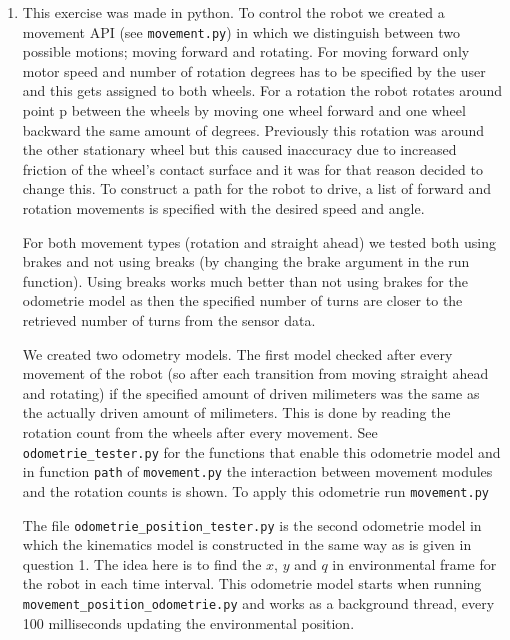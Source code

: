 \documentclass[a4paper, 20pt]{report}
\begin{document}
\begin{enumerate}
    \item
            This exercise was made in python. To control the robot we created 
            a movement API (see \texttt{movement.py})
            in which we distinguish between two possible motions; moving forward
            and rotating. For moving forward only motor speed and number of
            rotation degrees has to be specified by the user and this gets assigned to both
            wheels. For a rotation the robot rotates around point p between the
            wheels by moving
            one wheel forward and one wheel backward the same amount of degrees.
            Previously this rotation was around the other stationary wheel but
            this caused inaccuracy due to increased friction of the wheel's
            contact surface and it was for that reason decided to change this. 
            To construct a path for the robot to drive, a list of forward and rotation
            movements is specified with the desired speed and angle.

            For both movement types (rotation and straight ahead) we tested both using 
            brakes and not using breaks (by changing the brake argument in the run function). 
            Using breaks works much better than not using brakes for the
            odometrie model as then the specified number of turns are closer to
            the retrieved number of turns from the sensor data.

            We created two odometry models. The first model checked after every
            movement of the robot (so after each transition from moving straight
            ahead and rotating) if the specified amount of driven milimeters was the
            same as the actually driven amount of milimeters. This is done by
            reading the rotation count from the wheels after every movement. See
            \texttt{odometrie\_tester.py} for the functions that enable this
            odometrie model and in function \texttt{path} of \texttt{movement.py} the interaction
            between movement modules and the rotation counts is shown. To apply
            this odometrie run \texttt{movement.py}
            
            The file \texttt{odometrie\_position\_tester.py} is the second
            odometrie model in which the kinematics model is constructed in the
            same way as is given in question 1. The idea here is to find the
            $x$, $y$ and $q$ in environmental frame for the robot in each time
            interval. This odometrie model starts when running
            \texttt{movement\_position\_odometrie.py} and works as a background
            thread, every 100 milliseconds updating the environmental position.

\end{enumerate}
\end{document}
